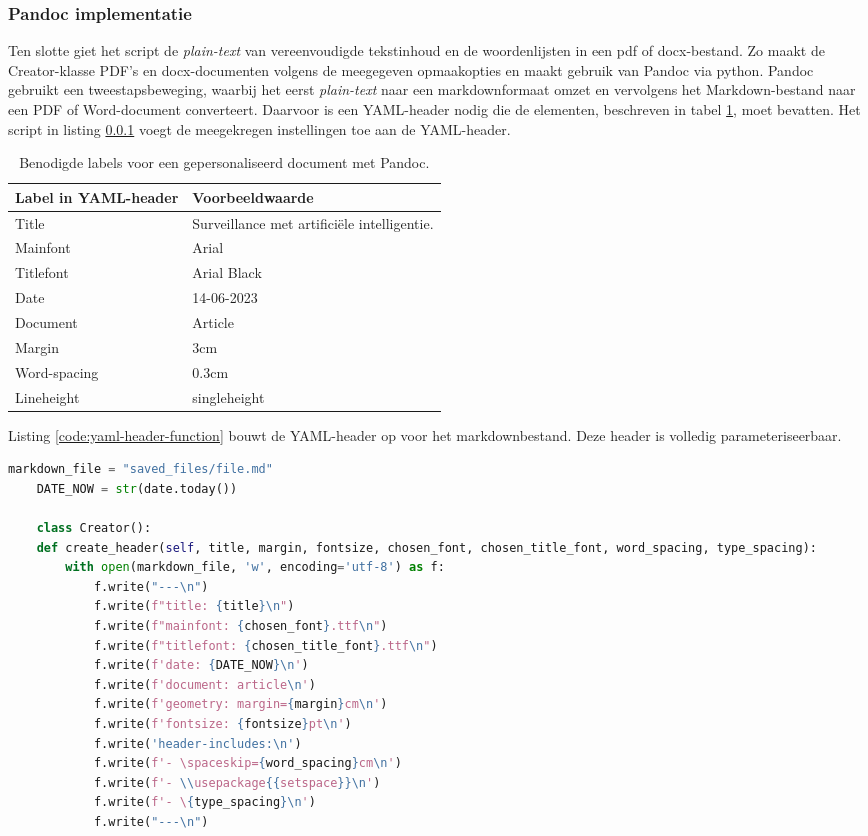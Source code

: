 \subsubsection{Pandoc implementatie}

Ten slotte giet het script de \textit{plain-text} van vereenvoudigde tekstinhoud en de woordenlijsten in een pdf of docx-bestand. Zo maakt de Creator-klasse PDF's en docx-documenten volgens de meegegeven opmaakopties en maakt gebruik van Pandoc via python.  Pandoc gebruikt een tweestapsbeweging, waarbij het eerst \textit{plain-text} naar een markdownformaat omzet en vervolgens het Markdown-bestand naar een PDF of Word-document converteert. Daarvoor is een YAML-header nodig die de elementen, beschreven in tabel \ref{table:personalized-pdf-word-document-with-pandoc}, moet bevatten. Het script in listing \ref{} voegt de meegekregen instellingen toe aan de YAML-header. 

\begin{table}[H]
	\begin{tabular}{ | m{5cm}| m{10cm} | }
		\hline
		\textbf{Label in YAML-header} & \textbf{Voorbeeldwaarde} \\ \hline
		Title & Surveillance met artificiële intelligentie. \\ \hline
		Mainfont & Arial \\ \hline 
		Titlefont & Arial Black \\ \hline
		Date & 14-06-2023 \\ \hline 
		Document & Article \\ \hline
		Margin & 3cm \\ \hline
		Word-spacing & 0.3cm \\ \hline 
		Lineheight & singleheight \\ \hline
	\end{tabular}
	\caption{Benodigde labels voor een gepersonaliseerd document met Pandoc.}
	\label{table:personalized-pdf-word-document-with-pandoc}
\end{table}

Listing \ref{code:yaml-header-function} bouwt de YAML-header op voor het markdownbestand. Deze header is volledig parameteriseerbaar.

\begin{lstlisting}[language=Python, caption={Writer-klasse omvattende de code om dynamische PDF- en Word-documenten te genereren.}, label={code:yaml-header-function}]
	markdown_file = "saved_files/file.md"
	DATE_NOW = str(date.today())
	
	class Creator():
	def create_header(self, title, margin, fontsize, chosen_font, chosen_title_font, word_spacing, type_spacing):
		with open(markdown_file, 'w', encoding='utf-8') as f:
			f.write("---\n")
			f.write(f"title: {title}\n") 
			f.write(f"mainfont: {chosen_font}.ttf\n")
			f.write(f"titlefont: {chosen_title_font}.ttf\n")
			f.write(f'date: {DATE_NOW}\n')
			f.write(f'document: article\n')
			f.write(f'geometry: margin={margin}cm\n')
			f.write(f'fontsize: {fontsize}pt\n')
			f.write('header-includes:\n')
			f.write(f'- \spaceskip={word_spacing}cm\n')
			f.write(f'- \\usepackage{{setspace}}\n')
			f.write(f'- \{type_spacing}\n')
			f.write("---\n")
\end{lstlisting}

